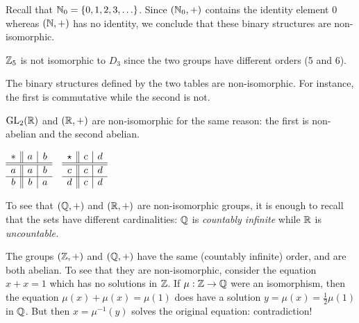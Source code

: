\begin{examples}{}{}
	\exstart Recall that $\mathbb{N}_0=\{0,1,2,3,\ldots\}$. Since $(\mathbb{N}_0,+)$ contains the identity element 0 whereas $(\mathbb{N},+)$ has no identity, we conclude that these binary structures are non-isomorphic.

	\begin{enumerate}\setcounter{enumi}{1}%
	  \item $\mathbb{Z}_5$ is not isomorphic to $D_3$ since the two groups have different orders (5 and 6).
	  
	  \goodbreak
	  
	  \begin{minipage}[t]{0.72\linewidth}\vspace{0pt}
	  	\item The binary structures defined by the two tables are non-isomorphic. For instance, the first is commutative while the second is not.
	  		  
	  	\item $\mathrm{GL}_2(\mathbb{R})$ and $(\mathbb{R},+)$ are non-isomorphic for the same reason: the first is non-abelian and the second abelian.
	  \end{minipage}
	  \hfill
	  \begin{minipage}[t]{0.27\linewidth}\vspace{0pt}
		  \flushright%
		  $\begin{array}[t]{c||c|c}
				* & a & b\\
				\hline\hline a & a & b\\
				\hline b & b & a
		  \end{array}
		  \quad
		  \begin{array}[t]{c||c|c}
				\star & c & d\\
				\hline\hline c & c & d\\
				\hline d & c & d
		  \end{array}$
	  \end{minipage}
	  \par 
	 	
	  
	  \item To see that $(\mathbb{Q},+)$ and $(\mathbb{R},+)$ are non-isomorphic groups, it is enough to recall that the sets have different cardinalities: $\mathbb{Q}$ is \emph{countably infinite} while $\mathbb{R}$ is \emph{uncountable.}


		\item The groups $(\mathbb{Z},+)$ and $(\mathbb{Q},+)$ have the same (countably infinite) order, and are both abelian. To see that they are non-isomorphic, consider the equation $x+x=1$ which has no solutions in $\mathbb{Z}$. If $\mu:\mathbb{Z}\to\mathbb{Q}$ were an isomorphism, then the equation $\mu(x)+\mu(x)=\mu(1)$ does have a solution $y=\mu(x)=\frac 12\mu(1)$ in $\mathbb{Q}$. But then $x=\mu^{-1}(y)$ solves the original equation: contradiction!
	\end{enumerate}
\end{examples}

